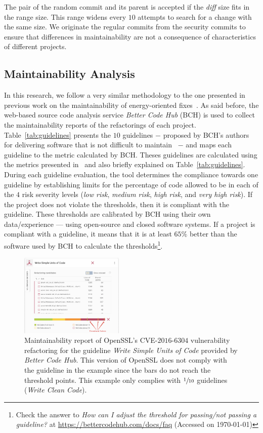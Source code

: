 \documentclass[10pt,conference]{IEEEtran}
\begin{document}
The pair of the random commit and its parent is accepted if the \emph{diff} 
size fits in the range size. This range widens every $10$ attempts to
search for a change with the same size. We originate the regular commits from the 
security commits to ensure that differences in maintainability are not a 
consequence of characteristics of different projects.

\subsection{Maintainability Analysis}

In this research, we follow a very similar methodology to the one presented 
in previous work on the maintainability of energy-oriented fixes~\cite{cruz2019energyoriented}. 
As said before, the web-based source code analysis service \emph{Better Code
Hub} (BCH) is used to collect the maintainability reports of the refactorings of
each project. Table~\ref{tab:guidelines} presents the $10$ guidelines $-$ proposed
by BCH's authors for delivering software that is not difficult to
maintain~\cite{Visser:2016:OREILLY} $-$ and maps each guideline to the metric 
calculated by BCH. Theses guidelines are calculated using the metrics 
presented in~\cite{criteria:2017} and also briefly explained on Table~\ref{tab:guidelines}. 
During each guideline evaluation, the tool determines the compliance towards 
one guideline by establishing limits for the percentage of code allowed to be 
in each of the $4$ risk severity levels
(\emph{low risk}, \emph{medium risk}, \emph{high risk}, and \emph{very high
risk}). If the project does not violate the thresholds, then it is compliant
with the guideline. These thresholds are calibrated by BCH using their own
data/experience --- using open-source and closed software systems. If a project is
compliant with a guideline, it means that it is at least $65\%$ better than the
software used by BCH to calculate the thresholds\footnote{Check the answer to
\emph{How can I adjust the threshold for passing/not passing a guideline?} at
\url{https://bettercodehub.com/docs/faq} (Accessed on \today{})}.

\begin{figure}[h]
 	\centering 	
	\includegraphics[width=0.44\textwidth]{figures/bch_report.png}
 	\caption{Maintainability report of OpenSSL's CVE-$2016$-$6304$ vulnerability
refactoring for the guideline \emph{Write Simple Units of Code} provided by
\emph{Better Code Hub}. This version of OpenSSL does not comply with the
guideline in the example since the bars do not reach the threshold points. This
example only complies with $\sfrac{1}{10}$ guidelines (\emph{Write Clean Code}).}
	\label{fig:bchrep}
\end{figure}
\end{document}
